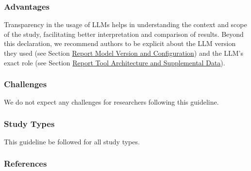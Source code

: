 \subsubsection{Advantages}

Transparency in the usage of LLMs helps in understanding the context and scope of the study, facilitating better interpretation and comparison of results.
Beyond this declaration, we recommend authors to be explicit about the LLM version they used (see Section \href{/guidelines/#report-model-version-and-configuration}{Report Model Version and Configuration}) and the LLM's exact role (see Section \href{/guidelines/#report-tool-architecture-and-supplemental-data}{Report Tool Architecture and Supplemental Data}).


\subsubsection{Challenges}

We do not expect any challenges for researchers following this guideline.


\subsubsection{Study Types}

This guideline \must be followed for all study types.


\subsubsection{References}





